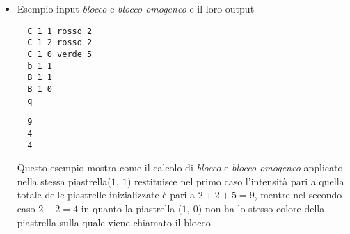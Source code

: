 \documentclass{article}
\begin{document}
\begin{itemize}
  \item  Esempio input \textit{blocco} e \textit{blocco omogeneo} e il loro output\\
  \begin{minipage}[t]{0.45\textwidth}
  \begin{verbatim}
  C 1 1 rosso 2
  C 1 2 rosso 2
  C 1 0 verde 5
  b 1 1
  B 1 1
  B 1 0
  q
  \end{verbatim}
  \end{minipage}
  \hfill
  \begin{minipage}[t]{0.45\textwidth}
  \begin{itemize}
  \begin{verbatim}
  9
  4
  4
  \end{verbatim}
  \end{itemize}
  \end{minipage}
  Questo esempio mostra come il calcolo di \textit{blocco} e \textit{blocco omogeneo} applicato nella stessa piastrella(\(1,\ 1\)) restituisce nel primo caso l'intensità pari a quella totale delle piastrelle inizializzate è pari a \(2+2+5 = 9\), mentre nel secondo caso \(2+2 = 4\) in quanto la piastrella (\(1,\ 0\)) non ha lo stesso colore della piastrella sulla quale viene chiamato il blocco.\\


\end{itemize}
\end{document}
